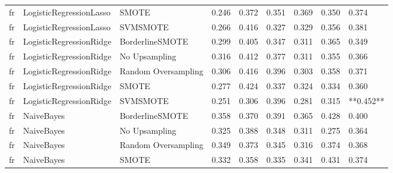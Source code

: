 \begin{tabular}{lllllllll}
      fr &      LogisticRegressionLasso &               SMOTE & 0.246 &                     0.372 &                 0.351 &                  0.369 &                                   0.350 &     0.374 \\
      fr &      LogisticRegressionLasso &            SVMSMOTE & 0.266 &                     0.416 &                 0.327 &                  0.329 &                                   0.356 &     0.381 \\
      fr &      LogisticRegressionRidge &     BorderlineSMOTE & 0.299 &                     0.405 &                 0.347 &                  0.311 &                                   0.365 &     0.349 \\
      fr &      LogisticRegressionRidge &       No Upsampling & 0.316 &                     0.412 &                 0.377 &                  0.311 &                                   0.355 &     0.366 \\
      fr &      LogisticRegressionRidge & Random Oversampling & 0.306 &                     0.416 &                 0.396 &                  0.303 &                                   0.358 &     0.371 \\
      fr &      LogisticRegressionRidge &               SMOTE & 0.277 &                     0.424 &                 0.337 &                  0.324 &                                   0.334 &     0.360 \\
      fr &      LogisticRegressionRidge &            SVMSMOTE & 0.251 &                     0.306 &                 0.396 &                  0.281 &                                   0.315 & **0.452** \\
      fr &                   NaiveBayes &     BorderlineSMOTE & 0.358 &                     0.370 &                 0.391 &                  0.365 &                                   0.428 &     0.400 \\
      fr &                   NaiveBayes &       No Upsampling & 0.325 &                     0.388 &                 0.348 &                  0.311 &                                   0.275 &     0.364 \\
      fr &                   NaiveBayes & Random Oversampling & 0.349 &                     0.373 &                 0.345 &                  0.316 &                                   0.374 &     0.368 \\
      fr &                   NaiveBayes &               SMOTE & 0.332 &                     0.358 &                 0.335 &                  0.341 &                                   0.431 &     0.374 \\

\end{tabular}
